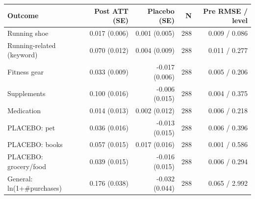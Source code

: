 \begin{tabular}{lrrrr}
\toprule
Outcome & Post ATT (SE) & Placebo (SE) & N & Pre RMSE / level \\
\midrule
Running shoe & 0.017 (0.006) & 0.001 (0.005) & 288 & 0.009 / 0.086 \\
Running-related (keyword) & 0.070 (0.012) & 0.004 (0.009) & 288 & 0.011 / 0.277 \\
Fitness gear & 0.033 (0.009) & -0.017 (0.006) & 288 & 0.005 / 0.206 \\
Supplements & 0.100 (0.016) & -0.006 (0.015) & 288 & 0.004 / 0.375 \\
Medication & 0.014 (0.013) & 0.002 (0.012) & 288 & 0.006 / 0.218 \\
PLACEBO: pet & 0.036 (0.016) & -0.013 (0.015) & 288 & 0.006 / 0.396 \\
PLACEBO: books & 0.057 (0.015) & 0.017 (0.016) & 288 & 0.001 / 0.586 \\
PLACEBO: grocery/food & 0.039 (0.015) & -0.016 (0.015) & 288 & 0.006 / 0.294 \\
General: ln(1+\#purchases) & 0.176 (0.038) & -0.032 (0.044) & 288 & 0.065 / 2.992 \\
\bottomrule
\end{tabular}
